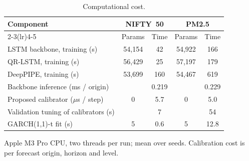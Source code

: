 \begin{table}[!t]\centering\caption{Computational cost.}\label{tab:runtime}
\scriptsize\setlength{\tabcolsep}{3pt}\begin{tabular}{lcccc}\toprule
Component & \multicolumn{2}{c}{NIFTY~50} & \multicolumn{2}{c}{PM2.5}\\\cmidrule(lr){2-3}\cmidrule(lr){4-5}
 & Params & Time & Params & Time\\\midrule
LSTM backbone, training (s) & 54,154 & 42 & 54,922 & 166\\
QR-LSTM, training (s) & 56,429 & 25 & 57,197 & 179\\
DeepPIPE, training (s) & 53,699 & 160 & 54,467 & 619\\
Backbone inference (ms / origin) &  & 0.219 &  & 0.229\\
Proposed calibrator ($\mu$s / step) & 0 & 5.7 & 0 & 5.0\\
Validation tuning of calibrators (s) &  & 7 &  & 54\\
GARCH(1,1)-t fit (s) & 5 & 0.6 & 5 & 12.8\\
\bottomrule\end{tabular}
\par\smallskip\parbox{\linewidth}{\scriptsize Apple M3 Pro CPU, two threads per run; mean over seeds. Calibration cost is per forecast origin, horizon and level.}
\end{table}
